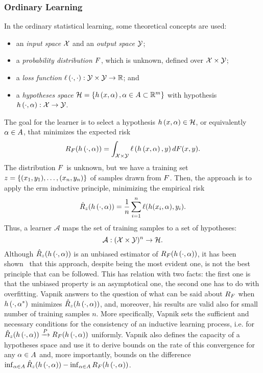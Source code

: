 \subsubsection*{Ordinary Learning}
In the ordinary statistical learning, some theoretical concepts are used:
\begin{itemize}
    \item an \emph{input space} $\mathcal{X}$ and an \emph{output space} $\mathcal{Y}$;
    \item a \emph{probability distribution} $F$, which is unknown, defined over $\mathcal{X} \times \mathcal{Y}$;
    \item a \emph{loss function} $\ell\left( \cdot, \cdot\right):\mathcal{Y} \times \mathcal{Y} \to \mathbb{R}$; and
    \item a \emph{hypotheses space} $\mathcal{H} = \left\{h\left(x, \alpha\right), \alpha \in A \subset \mathbb{R}^m\right\}$ with hypothesis $h\left(\cdot, \alpha\right): \mathcal{X} \to \mathcal{Y}$.
\end{itemize}
The goal for the learner is to select a hypothesis $h\left(x, \alpha\right) \in \mathcal{H}$, or equivalently $\alpha \in A$, that minimizes the expected risk
$$ R_F(h\left(\cdot, \alpha\right)) =  \int_{\mathcal{X} \times \mathcal{Y}} \ell\left( h\left(x, \alpha\right), y\right) dF(x, y) .$$
The distribution $F$ is unknown, but we have a training set $z = \{(x_1, y_1), \ldots, (x_n, y_n)\}$ of samples drawn from $F$. 
Then, the approach is to apply the \acrshort{erm} inductive principle, minimizing the empirical risk
$$ \hat{R}_z(h\left(\cdot, \alpha\right)) = \frac{1}{n} \sum_{i=1}^n \ell(h(x_i, \alpha), y_i).$$
Thus, a learner $\mathcal{A}$ maps the set of training samples to a set of hypotheses:
\begin{equation}
    \nonumber
    \mathcal{A} : {(\mathcal{X} \times \mathcal{Y})^n} \to \mathcal{H}.
\end{equation}
Although $\hat{R}_z(h\left(\cdot, \alpha\right))$ is an unbiased estimator of $R_F(h\left(\cdot, \alpha\right))$, it has been shown~\citep{Vapnik00} that this approach, despite being the most evident one, is not the best principle that can be followed.
This has relation with two facts: the first one is that the unbiased property is an asymptotical one, the second one has to do with overfitting.
Vapnik answers to the question of what can be said about $R_F$ when $h\left(\cdot, \alpha^*\right)$ minimizes $\hat{R}_z(h\left(\cdot, \alpha\right))$, and, moreover, his results are valid also for small number of training samples $n$.
More specifically, Vapnik sets the sufficient and necessary conditions for the consistency of an inductive learning process, i.e. for $\hat{R}_z(h\left(\cdot, \alpha\right)) \xrightarrow{P} R_F(h\left(\cdot, \alpha\right)) $ uniformly. Vapnik also defines the capacity of a hypotheses space and use it to derive bounds on the rate of this convergence for any $\alpha \in A$ and, more importantly, bounds on the difference $\inf_{\alpha \in A} \hat{R}_z(h\left(\cdot, \alpha\right)) - \inf_{\alpha \in A} R_F(h\left(\cdot, \alpha\right))$.
